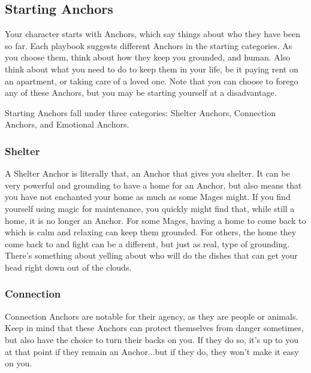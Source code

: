 \documentclass[
  oneside,
  statementpaper,
  9pt]{memoir}
\begin{document}
\hypertarget{starting-anchors}{%
\subsection{Starting Anchors}\label{starting-anchors}}

\begin{Player}

Your character starts with Anchors, which say things about who they have been so far. Each playbook suggests different Anchors in the starting categories. As you choose them, think about how they keep you grounded, and human. Also think about what you need to do to keep them in your life, be it paying rent on an apartment, or taking care of a loved one. Note that you can choose to forego any of these Anchors, but you may be starting yourself at a disadvantage.

Starting Anchors fall under three categories: Shelter Anchors, Connection Anchors, and Emotional Anchors.

\end{Player}

\hypertarget{shelter}{%
\subsubsection{Shelter}\label{shelter}}

\begin{Player}

A Shelter Anchor is literally that, an Anchor that gives you shelter. It can be very powerful and grounding to have a home for an Anchor, but also means that you have not enchanted your home as much as some Mages might. If you find yourself using magic for maintenance, you quickly might find that, while still a home, it is no longer an Anchor. For some Mages, having a home to come back to which is calm and relaxing can keep them grounded. For others, the home they come back to and fight can be a different, but just as real, type of grounding. There’s something about yelling about who will do the dishes that can get your head right down out of the clouds.

\end{Player}

\hypertarget{connection}{%
\subsubsection{Connection}\label{connection}}

\begin{Player}

Connection Anchors are notable for their agency, as they are people or animals. Keep in mind that these Anchors can protect themselves from danger sometimes, but also have the choice to turn their backs on you. If they do so, it’s up to you at that point if they remain an Anchor...but if they do, they won’t make it easy on you.

\end{Player}
\end{document}
